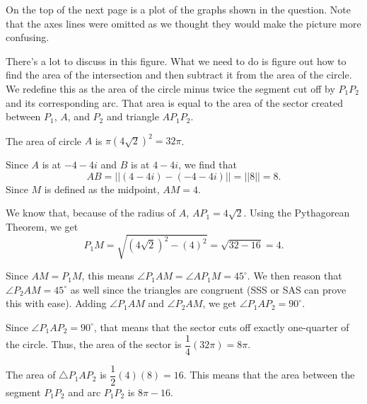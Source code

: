 \documentclass[lang=en,11pt]{elegantbook}
\begin{document}
On the top of the next page is a plot of the graphs shown in the question.  Note that the axes lines were omitted as we thought they would make the picture more confusing.

\begin{figure}[!h]
    \centering
\end{figure}

There's a lot to discuss in this figure.  What we need to do is figure out how to find the area of the intersection and then subtract it from the area of the circle.  We redefine this as the area of the circle minus twice the segment cut off by $P_1P_2$ and its corresponding arc.  That area is equal to the area of the sector created between $P_1$, $A$, and $P_2$ and triangle $AP_1P_2$.

The area of circle $A$ is $\pi\left(4\sqrt{2}\right)^2=32\pi$.

Since $A$ is at $-4-4i$ and $B$ is at $4-4i$, we find that $$AB=||(4-4i)-(-4-4i)||=||8||=8.$$  Since $M$ is defined as the midpoint, $AM=4$.

We know that, because of the radius of $A$, $AP_1=4\sqrt{2}$.  Using the Pythagorean Theorem, we get $$P_1M=\sqrt{(4\sqrt{2})^2-(4)^2}=\sqrt{32-16}=4.$$

Since $AM=P_1M$, this means $\angle P_1AM=\angle AP_1M=45^{\circ}.$  We then reason that $\angle P_2AM=45^{\circ}$ as well since the triangles are congruent (SSS or SAS can prove this with ease).  Adding $\angle P_1AM$ and $\angle P_2AM$, we get $\angle P_1AP_2=90^{\circ}$.

Since $\angle P_1AP_2=90^{\circ}$, that means that the sector cuts off exactly one-quarter of the circle.  Thus, the area of the sector is $\dfrac{1}{4}(32\pi)=8\pi.$

The area of $\triangle P_1AP_2$ is $\dfrac{1}{2}(4)(8)=16$.  This means that the area between the segment $P_1P_2$ and arc $P_1P_2$ is $8\pi-16$.
\end{document}
